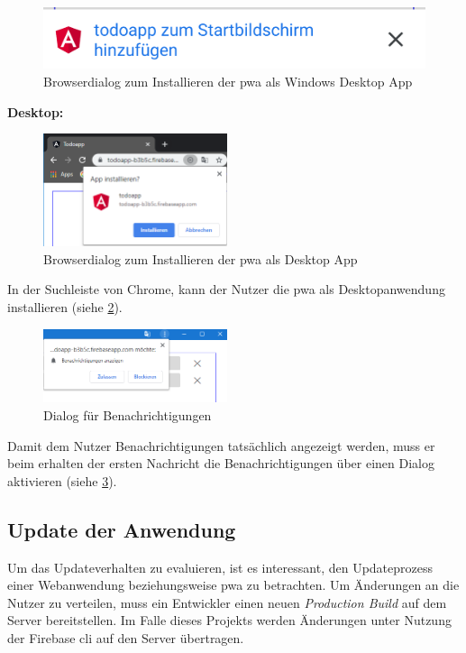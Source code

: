 \begin{figure}[h!]
	\includegraphics[scale=0.5]{img/pwa_add_to_homescreen.png}
	\centering
	\caption{Browserdialog zum Installieren der \ac{pwa} als Windows Desktop App}
	\label{fig:dialog_install_pwa_mobile}
\end{figure}

\textbf{Desktop:}
\begin{figure}[h!]
	\centering
	\includegraphics[width=0.48\textwidth]{img/add_to_desktop_2.PNG}
	\caption{Browserdialog zum Installieren der \ac{pwa} als Desktop App}
	\label{fig:dialog_install_pwa_desktop}
\end{figure}
In der Suchleiste von Chrome, kann der Nutzer die \ac{pwa} als Desktopanwendung installieren (siehe \ref{fig:dialog_install_pwa_desktop}).

\begin{figure}[h!]	
	\includegraphics[width=0.48\textwidth]{img/berechtigungen_zulassen.PNG}
	\centering
	\caption{Dialog für Benachrichtigungen}
	\label{fig:pwa_benachrichtigungen_zulassen}
\end{figure}
Damit dem Nutzer Benachrichtigungen tatsächlich angezeigt werden, muss er beim erhalten der ersten Nachricht die Benachrichtigungen über einen Dialog aktivieren (siehe \ref{fig:pwa_benachrichtigungen_zulassen}).

\subsection{Update der Anwendung}

Um das Updateverhalten zu evaluieren, ist es interessant, den Updateprozess einer Webanwendung beziehungsweise \ac{pwa} zu betrachten. Um Änderungen an die Nutzer zu verteilen, muss ein Entwickler einen neuen \textit{Production Build} auf dem Server bereitstellen. Im Falle dieses Projekts werden Änderungen unter Nutzung der Firebase \ac{cli} auf den Server übertragen.

